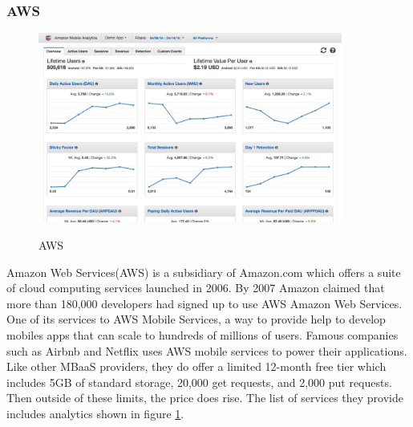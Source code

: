 \subsubsection{AWS}

\begin{figure}[!h]
    \caption{AWS}
    \centering
    \includegraphics[width=100mm]{images/aws}
    \label{fig:aws}
\end{figure}

Amazon Web Services(AWS) \cite{aws} is a subsidiary of Amazon.com which offers a suite of cloud computing services launched in 2006. By 2007 Amazon claimed that more than 180,000 developers had signed up to use AWS Amazon Web Services. One of its services to AWS Mobile Services, a way to provide help to develop mobiles apps that can scale to hundreds of millions of users. Famous companies such as Airbnb and Netflix uses AWS mobile services to power their applications. Like other MBaaS providers, they do offer a limited 12-month free tier which includes 5GB of standard storage, 20,000 get requests, and 2,000 put requests. Then outside of these limits, the price does rise. The list of services they provide includes analytics shown in figure \ref{fig:aws}.




